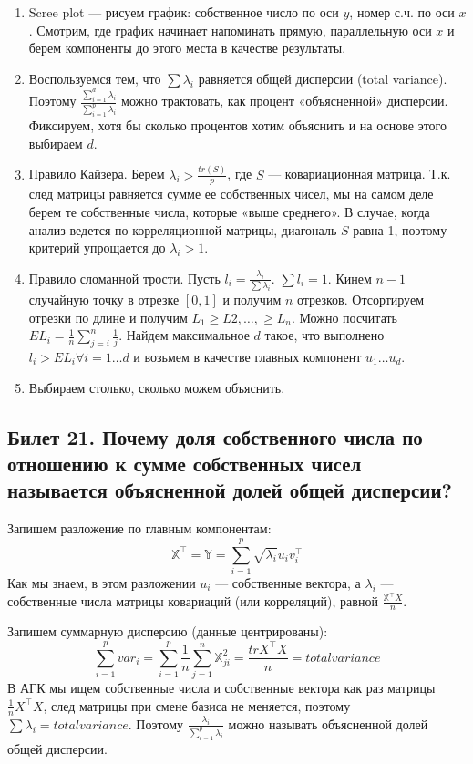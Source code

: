 \begin{enumerate}
\item Scree plot — рисуем график: собственное число по оси $y$, номер с.ч. по оси $x$. Смотрим, где график начинает напоминать прямую, параллельную оси $x$ и берем компоненты до этого места в качестве результаты.
\item Воспользуемся тем, что $\sum \lambda_i$ равняется общей дисперсии (total variance). Поэтому 
$\frac{\sum_{i=1}^{d} \lambda_i}{\sum_{i=1}^{p}\lambda_i}$ можно трактовать, как процент «объясненной» дисперсии. Фиксируем, хотя бы сколько процентов хотим объяснить и на основе этого выбираем $d$.
\item Правило Кайзера. Берем $\lambda_i > \frac{tr(S)}{p}$, где $S$ — ковариационная матрица. Т.к. след матрицы равняется сумме ее собственных чисел, мы на самом деле берем те собственные числа, которые «выше среднего». 
В случае, когда анализ ведется по корреляционной матрицы, диагональ $S$ равна 1, поэтому критерий упрощается до $\lambda_i > 1$. 
\item Правило сломанной трости. Пусть $l_i = \frac{\lambda_i}{\sum\lambda_i}$. $\sum l_i = 1$. Кинем $n-1$ случайную точку в отрезке $[0,1]$ и получим $n$ отрезков. Отсортируем отрезки по длине и получим $L_1 \geq L2,…,\geq L_n$. Можно посчитать $EL_i = \frac{1}{n}\sum\limits_{j=i}^{n} \frac{1}{j}$. 
Найдем максимальное $d$  такое, что выполнено $l_i > EL_i \forall i = 1…d$ и возьмем в качестве главных компонент $u_1…u_d$. 
\item Выбираем столько, сколько можем объяснить.  
\end{enumerate} 

\subsection{Билет 21. Почему доля собственного числа по отношению к сумме собственных чисел называется
объясненной долей общей дисперсии?}
Запишем разложение по главным компонентам:
$$ \mathbb{X}^{\intercal}=\mathbb{Y} = \sum \limits_{i=1}^{p} \sqrt{\lambda_i}u_iv_i^{\intercal}$$
Как мы знаем, в этом разложении $u_i$ — собственные вектора, а $\lambda_i$ — собственные числа матрицы ковариаций (или корреляций), равной $\frac{\mathbb{X}^{\intercal}X}{n}$.

Запишем суммарную дисперсию (данные центрированы):
$$ \sum_{i=1}^{p} var_i= \sum_{i=1}^{p} \frac{1}{n}\sum_{j=1}^{n}\mathbb{X}_{ji}^2 = \frac{tr{X^{\intercal}X}}{n} = total variance$$
В АГК мы ищем собственные числа и собственные вектора как раз матрицы $\frac{1}{n}X^{\intercal}X$, след матрицы при смене базиса не меняется, поэтому $\sum \lambda_i = total variance$. 
Поэтому $\frac{\lambda_i}{\sum\limits_{i=1}^{p}\lambda_i}$ можно называть объясненной долей общей дисперсии. 
